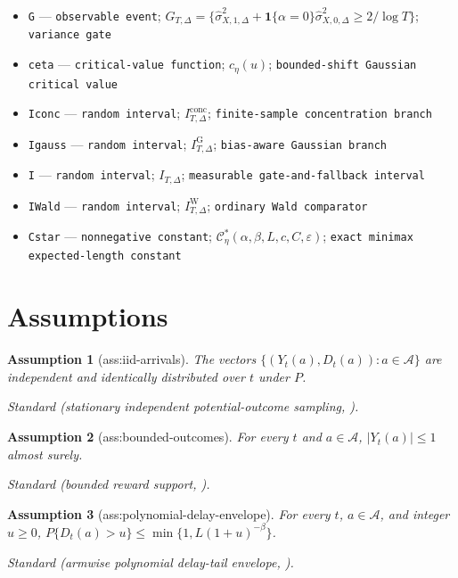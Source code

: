 \documentclass{article}
\newtheorem{assumption}{Assumption}
\begin{document}
\begin{itemize}
  \item \texttt{G} --- \texttt{observable event}; \(G_{T,\Delta}=\{\widehat\sigma_{X,1,\Delta}^2+\mathbf 1\{\alpha=0\}\widehat\sigma_{X,0,\Delta}^2\geq2/\log T\}\); \texttt{variance gate}
  \item \texttt{ceta} --- \texttt{critical-\allowbreak{}value function}; \(c_\eta(u)\); \texttt{bounded-\allowbreak{}shift Gaussian critical value}
  \item \texttt{Iconc} --- \texttt{random interval}; \(I_{T,\Delta}^{\mathrm{conc}}\); \texttt{finite-\allowbreak{}sample concentration branch}
  \item \texttt{Igauss} --- \texttt{random interval}; \(I_{T,\Delta}^{\mathrm G}\); \texttt{bias-\allowbreak{}aware Gaussian branch}
  \item \texttt{I} --- \texttt{random interval}; \(I_{T,\Delta}\); \texttt{measurable gate-\allowbreak{}and-\allowbreak{}fallback interval}
  \item \texttt{IWald} --- \texttt{random interval}; \(I_{T,\Delta}^{\mathrm W}\); \texttt{ordinary Wald comparator}
  \item \texttt{Cstar} --- \texttt{nonnegative constant}; \(\mathcal C_\eta^*(\alpha,\beta,L,c,C,\varepsilon)\); \texttt{exact minimax expected-\allowbreak{}length constant}
\end{itemize}

\section{Assumptions}

\begin{assumption}[ass:iid-arrivals]\label{ass:iid-arrivals}
The vectors \(\{(Y_t(a),D_t(a)):a\in\mathcal A\}\) are independent and identically distributed over \(t\) under \(P\).
\par\smallskip\noindent\emph{Standard} (stationary independent potential-outcome sampling, \cite{HadadHirshbergZhanWagerAthey2021}).
\end{assumption}

\begin{assumption}[ass:bounded-outcomes]\label{ass:bounded-outcomes}
For every \(t\) and \(a\in\mathcal A\), \(|Y_t(a)|\leq1\) almost surely.
\par\smallskip\noindent\emph{Standard} (bounded reward support, \cite{LancewickiSegalKorenMansour2021}).
\end{assumption}

\begin{assumption}[ass:polynomial-delay-envelope]\label{ass:polynomial-delay-envelope}
For every \(t\), \(a\in\mathcal A\), and integer \(u\geq0\), \(P\{D_t(a)>u\}\leq\min\{1,L(1+u)^{-\beta}\}\).
\par\smallskip\noindent\emph{Standard} (armwise polynomial delay-tail envelope, \cite{GaelVernadeCarpentierValko2020}).
\end{assumption}
\end{document}
